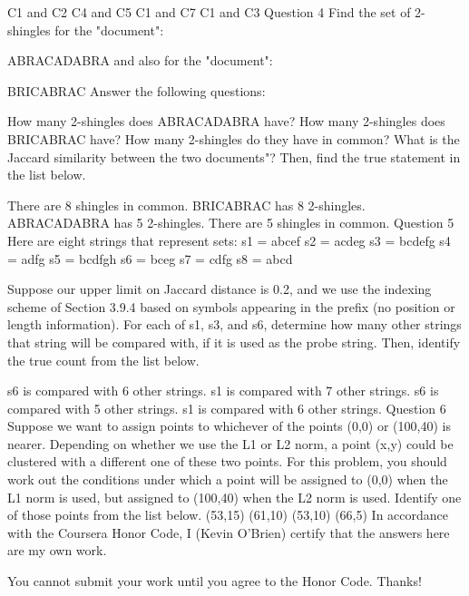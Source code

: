 C1 and C2
C4 and C5
C1 and C7
C1 and C3
Question 4
Find the set of 2-shingles for the "document":

ABRACADABRA
and also for the "document":


BRICABRAC
Answer the following questions:

How many 2-shingles does ABRACADABRA have?
How many 2-shingles does BRICABRAC have?
How many 2-shingles do they have in common?
What is the Jaccard similarity between the two documents"?
Then, find the true statement in the list below.

There are 8 shingles in common.
BRICABRAC has 8 2-shingles.
ABRACADABRA has 5 2-shingles.
There are 5 shingles in common.
Question 5
Here are eight strings that represent sets:
s1 = abcef
s2 = acdeg
s3 = bcdefg
s4 = adfg
s5 = bcdfgh
s6 = bceg
s7 = cdfg
s8 = abcd

Suppose our upper limit on Jaccard distance is 0.2, and we use the indexing scheme of Section 3.9.4 based on symbols appearing in the prefix (no position or length information). For each of s1, s3, and s6, determine how many other strings that string will be compared with, if it is used as the probe string. Then, identify the true count from the list below.

s6 is compared with 6 other strings.
s1 is compared with 7 other strings.
s6 is compared with 5 other strings.
s1 is compared with 6 other strings.
Question 6
Suppose we want to assign points to whichever of the points (0,0) or (100,40) is nearer. Depending on whether we use the L1 or L2 norm, a point (x,y) could be clustered with a different one of these two points. For this problem, you should work out the conditions under which a point will be assigned to (0,0) when the L1 norm is used, but assigned to (100,40) when the L2 norm is used. Identify one of those points from the list below.
(53,15)
(61,10)
(53,10)
(66,5)
In accordance with the Coursera Honor Code, I (Kevin O'Brien) certify that the answers here are my own work.
       
You cannot submit your work until you agree to the Honor Code. Thanks!

